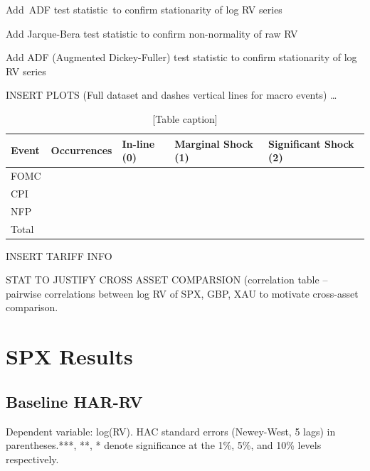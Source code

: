 \documentclass[12pt,a4paper]{report}
\begin{document}
Add ADF test statistic to confirm stationarity of log RV series

Add Jarque-Bera test statistic to confirm non-normality of raw RV

Add ADF (Augmented Dickey-Fuller) test statistic to confirm stationarity of log RV series

INSERT PLOTS (Full dataset and dashes vertical lines for macro events) \ldots{}

\begin{table}[H]
\centering
\begin{tabular}{|l|l|l|l|l|}
\hline
Event & Occurrences & In-line (0) & Marginal Shock (1) & Significant Shock (2) \\
\hline
FOMC &  &  &  &  \\
\hline
CPI &  &  &  &  \\
\hline
NFP &  &  &  &  \\
\hline
Total &  &  &  &  \\
\hline
\end{tabular}
\caption{[Table caption]}
\end{table}
INSERT TARIFF INFO

STAT TO JUSTIFY CROSS ASSET COMPARSION (correlation table -- pairwise correlations between log RV of SPX, GBP, XAU to motivate cross-asset comparison.

\section{SPX Results}
\subsection{Baseline HAR-RV}
Dependent variable: log(RV). HAC standard errors (Newey-West, 5 lags) in parentheses.***, **, * denote significance at the 1\%, 5\%, and 10\% levels respectively.
\end{document}
